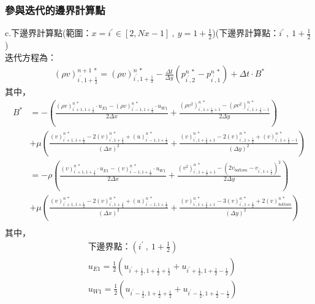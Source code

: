 \documentclass[12pt]{article}
\begin{document}
\subsubsection{參與迭代的邊界計算點}
\noindent c.下邊界計算點(範圍：$x = i^{\prime} \in [2,Nx-1]\ ,\  y = 1+\frac{1}{2}$)(下邊界計算點：$i^{\prime}\ ,\ 1+\frac{1}{2}$)\\[1.5ex]
\noindent 迭代方程為：
\begin{equation}\begin{split}
    (\rho v)_{i^{\prime},1+\frac{1}{2}}^{n+1\ *} = (\rho v)_{i^{\prime},1+\frac{1}{2}}^{n\ *} - \frac{\Delta t}{\Delta y}(p_{i^{\prime},2}^{n\ *} - p_{i^{\prime},1}^{n\ *}) + \Delta t\cdot B^{*}
\end{split}\end{equation}
\noindent 其中，
\begin{equation*}\begin{split}
    B^{*} 
    &= -\left(\frac{(\rho v)_{i^{\prime}+1,1+\frac{1}{2}}^{n\ *}\cdot u_{E1} - (\rho v)_{i^{\prime}-1,1+\frac{1}{2}}^{n\ *}\cdot u_{W1}}{2\Delta x} + \frac{(\rho v^{2})_{i^{\prime},1+\frac{1}{2}+1}^{n\ *}- (\rho v^{2})_{i^{\prime},1+\frac{1}{2}-1}^{n\ *}}{2\Delta y}\right)\\[1.5ex]
    &+\mu\left(\frac{(v)_{i^{\prime}+1,1+\frac{1}{2}}^{n\ *}-2(v)_{i^{\prime},1+\frac{1}{2}}^{n\ *}+(u)_{i^{\prime}-1,1+\frac{1}{2}}^{n\ *}}{(\Delta x)^{2}}+\frac{(v)_{i^{\prime},1+\frac{1}{2}+1}^{n\ *}-2(v)_{i^{\prime},1+\frac{1}{2}}^{n\ *}+(v)_{i^{\prime},1+\frac{1}{2}-1}^{n\ *}}{(\Delta y)^{2}}\right)\\[1.5ex]
    &= -\rho \left(\frac{(v)_{i^{\prime}+1,1+\frac{1}{2}}^{n\ *}\cdot u_{E1} - (v)_{i^{\prime}-1,1+\frac{1}{2}}^{n\ *}\cdot u_{W1}}{2\Delta x} + \frac{(v^{2})_{i^{\prime},1+\frac{1}{2}+1}^{n\ *}- (2v_{bottom} - v_{i^{\prime},1+\frac{1}{2}})^{2}}{2\Delta y}\right)\\[1.5ex]
    &+\mu\left(\frac{(v)_{i^{\prime}+1,1+\frac{1}{2}}^{n\ *}-2(v)_{i^{\prime},1+\frac{1}{2}}^{n\ *}+(u)_{i^{\prime}-1,1+\frac{1}{2}}^{n\ *}}{(\Delta x)^{2}}+\frac{(v)_{i^{\prime},1+\frac{1}{2}+1}^{n\ *}-3(v)_{i^{\prime},1+\frac{1}{2}}^{n\ *}+2(v)_{bottom}^{n\ *}}{(\Delta y)^{2}}\right)\\[1.5ex]
\end{split}\end{equation*}
\noindent 其中，
\begin{equation*}\begin{split}
    &\text{下邊界點：$(i^{\prime}\ ,\ 1+\frac{1}{2})$}\\[1.5ex]
    &u_{E1} = \frac{1}{2}(u_{i^{\prime}+\frac{1}{2},1+\frac{1}{2}+\frac{1}{2}}+u_{i^{\prime}+\frac{1}{2},1+\frac{1}{2}-\frac{1}{2}})\\[1.5ex]
    &u_{W1} = \frac{1}{2}(u_{i^{\prime}-\frac{1}{2},1+\frac{1}{2}+\frac{1}{2}}+u_{i^{\prime}-\frac{1}{2},1+\frac{1}{2}-\frac{1}{2}})\\[1.5ex]
\end{split}\end{equation*}
\end{document}

